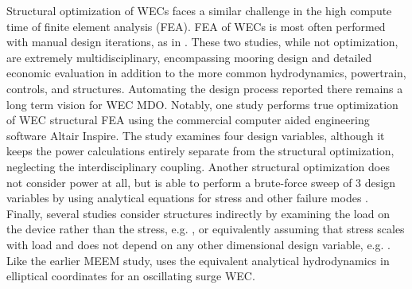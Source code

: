 Structural optimization of WECs faces a similar challenge in the high compute time of finite element analysis (FEA).
FEA of WECs is most often performed with manual design iterations, as in \cite{RM3,mi_multi-scale_2025}.
These two studies, while not optimization, are extremely multidisciplinary, encompassing mooring design and detailed economic evaluation in addition to the more common hydrodynamics, powertrain, controls, and structures.
Automating the design process reported there remains a long term vision for WEC MDO.
Notably, one study \cite{an_optimal_2024} performs true optimization of WEC structural FEA using the commercial computer aided engineering software Altair Inspire.
The study examines four design variables, although it keeps the power calculations entirely separate from the structural optimization, neglecting the interdisciplinary coupling.
Another structural optimization does not consider power at all, but is able to perform a brute-force sweep of 3 design variables by using analytical equations for stress and other failure modes \cite{ambuhl_reliability-based_2014}.
Finally, several studies consider structures indirectly by examining the load on the device rather than the stress, e.g. \cite{nguyen_theoretical_2024, ferri_balancing_2014}, or equivalently assuming that stress scales with load and does not depend on any other dimensional design variable, e.g. \cite{garcia-teruel_reliability-based_2021, cotten_multi-objective_2022}.
Like the earlier MEEM study, \cite{nguyen_theoretical_2024} uses the equivalent analytical hydrodynamics in elliptical coordinates for an oscillating surge WEC.


